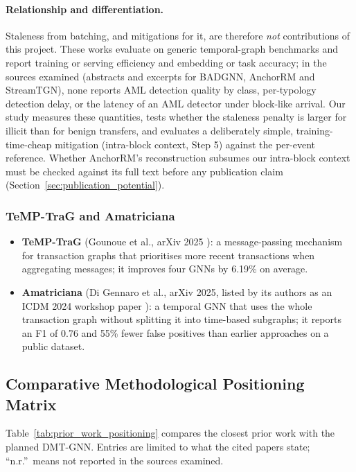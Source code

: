 \documentclass[11pt,a4paper]{article}
\begin{document}
\paragraph{Relationship and differentiation.} Staleness from batching, and mitigations for it, are therefore \emph{not} contributions of this project. These works evaluate on generic temporal-graph benchmarks and report training or serving efficiency and embedding or task accuracy; in the sources examined (abstracts and excerpts for BADGNN, AnchorRM and StreamTGN), none reports AML detection quality by class, per-typology detection delay, or the latency of an AML detector under block-like arrival. Our study measures these quantities, tests whether the staleness penalty is larger for illicit than for benign transfers, and evaluates a deliberately simple, training-time-cheap mitigation (intra-block context, Step 5) against the per-event reference. Whether AnchorRM's reconstruction subsumes our intra-block context must be checked against its full text before any publication claim (Section~\ref{sec:publication_potential}).

\subsubsection{TeMP-TraG and Amatriciana}
\begin{itemize}[leftmargin=*]
    \item \textbf{TeMP-TraG} (Gounoue et al., arXiv 2025 \cite{gounoue2025tempt}): a message-passing mechanism for transaction graphs that prioritises more recent transactions when aggregating messages; it improves four GNNs by 6.19\% on average.
    \item \textbf{Amatriciana} (Di Gennaro et al., arXiv 2025, listed by its authors as an ICDM 2024 workshop paper \cite{digennaro2025amatriciana}): a temporal GNN that uses the whole transaction graph without splitting it into time-based subgraphs; it reports an F1 of 0.76 and 55\% fewer false positives than earlier approaches on a public dataset.
\end{itemize}

\subsection{Comparative Methodological Positioning Matrix}
Table~\ref{tab:prior_work_positioning} compares the closest prior work with the planned DMT-GNN. Entries are limited to what the cited papers state; ``n.r.''\ means not reported in the sources examined.
\end{document}
